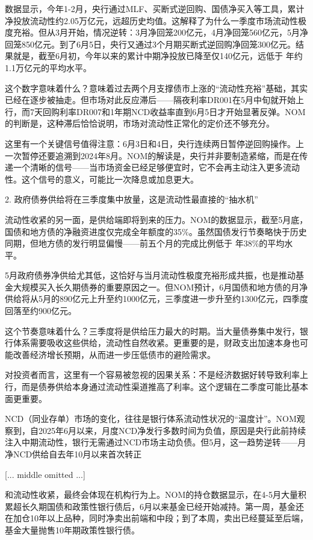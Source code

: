 \documentclass[11pt]{ctexart}
\begin{document}
数据显示，今年1-2月，央行通过MLF、买断式逆回购、国债净买入等工具，累计净投放流动性约2.05万亿元，远超历史均值。这解释了为什么一季度市场流动性极度充裕。但从3月开始，情况逆转：3月净回笼200亿元，4月净回笼560亿元，5月净回笼850亿元。到了6月5日，央行又通过3个月期买断式逆回购净回笼300亿元。结果就是，截至6月初，今年以来的累计中期净投放已降至仅140亿元，远低于 年约1.1万亿元的平均水平。

这个数字意味着什么？意味着过去两个月支撑债市上涨的“流动性充裕”基础，其实已经在逐步被抽走。但市场对此反应滞后——隔夜利率DR001在5月中旬就开始上行，而7天回购利率DR007和1年期NCD收益率直到6月5日才开始显著反弹。NOM的判断是，这种滞后恰恰说明，市场对流动性正常化的定价还不够充分。

这里有一个关键信号值得注意：6月3日和4日，央行连续两日暂停逆回购操作。上一次暂停还要追溯到2024年8月。NOM的解读是，央行并非要制造紧缩，而是在传递一个清晰的信号——当市场资金已经足够便宜时，它不会再主动注入更多流动性。这个信号的意义，可能比一次降息或加息更大。

2. 政府债券供给将在三季度集中放量，这是流动性最直接的“抽水机”

流动性收紧的另一面，是供给端即将到来的压力。NOM的数据显示，截至5月底，国债和地方债的净融资进度仅完成全年额度的35\%。虽然国债发行节奏略快于历史同期，但地方债的发行明显偏慢——前五个月的完成比例低于 年38\%的平均水平。

5月政府债券净供给尤其低，这恰好与当月流动性极度充裕形成共振，也是推动基金大规模买入长久期债券的重要原因之一。但NOM预计，6月国债和地方债的月净供给将从5月的890亿元上升至约1000亿元，三季度进一步升至约1300亿元，四季度回落至约900亿元。

这个节奏意味着什么？三季度将是供给压力最大的时期。当大量债券集中发行，银行体系需要吸收这些供给，流动性自然收紧。更重要的是，财政支出加速本身也可能改善经济增长预期，从而进一步压低债市的避险需求。

对投资者而言，这里有一个容易被忽视的因果关系：不是经济数据好转导致利率上行，而是债券供给本身通过流动性渠道推高了利率。这个逻辑在二季度可能比基本面更重要。

NCD（同业存单）市场的变化，往往是银行体系流动性状况的“温度计”。NOM观察到，自2025年6月以来，月度NCD净发行多数时间为负值，原因是央行此前持续注入中期流动性，银行无需通过NCD市场主动负债。但5月，这一趋势逆转——月净NCD供给自去年10月以来首次转正

[... middle omitted ...]

和流动性收紧，最终会体现在机构行为上。NOM的持仓数据显示，在4-5月大量积累超长久期国债和政策性银行债后，6月以来基金已经开始减持。第一周，基金还在加仓10年以上品种，同时净卖出前端和中段；到了本周，卖出已经蔓延至后端，基金大量抛售10年期政策性银行债。
\end{document}
